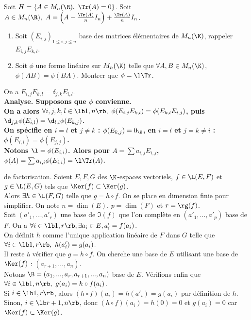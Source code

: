 \documentclass[11pt]{article}
\begin{document}
\begin{ex}{}{}
    Soit $H=\{A\in M_n(\R), ~ \Tr(A)=0\}$. Soit $A\in M_n(\R), ~ A=\left( A-\frac{\Tr(A)}{n}I_n \right)+\frac{\Tr(A)}{n}I_n$.
\end{ex}

\vspace*{-0.8cm}

\begin{ex}{}{}
    \begin{enumerate}
        \item Soit $(E_{i,j})_{1\leq i,j \leq n}$ base des matrices élémentaires de $M_n(\K)$, rappeler $E_{i,j}E_{k,l}$.
        \item Soit $\phi$ une forme linéaire sur $M_n(\K)$ telle que $\forall A,B \in M_n(\K)$, $\phi(AB)=\phi(BA)$. Montrer que $\phi=\l\Tr$.
    \end{enumerate}
    \tcblower
     On a $E_{i,j}E_{k,l}=\delta_{j,k}E_{i,l}$.\\
     \bf{Analyse.} Supposons que $\phi$ convienne.\\
    On a alors $\forall i,j,k,l \in \lb1,n\rb, ~ \phi(E_{i,j}E_{k,l})=\phi(E_{k,l}E_{i,j})$, puis $\d_{j,k}\phi(E_{i,l})=\d_{l,i}\phi(E_{k,j})$.\\
    On spécifie en $i=l$ et $j\neq k$ : $\phi(E_{k,j})=0_\K$, en $i=l$ et $j=k\neq i$ : $\phi(E_{i,i})=\phi(E_{j,j})$.\\
    Notons $\l=\phi(E_{i,i})$. Alors pour $A=\sum a_{i,j}E_{i,j}$, $\phi(A)=\sum a_{i,i}\phi(E_{i,i})=\l\Tr(A)$.
\end{ex}

\vspace*{-0.8cm}

\begin{lemme}{de factorisation.}{}
    Soient $E,F,G$ des $\K$-espaces vectoriels, $f\in\L(E,F)$ et $g\in\L(E,G)$ tels que $\Ker(f)\subset\Ker(g)$.\\
    Alors $\exists h \in \L(F,G)$ telle que $g=h\circ f$.
    \tcblower
    On se place en dimension finie pour simplifier. On note $n=\dim(E)$, $p=\dim(F)$ et $r=\rg(f)$.\\
    Soit $(a'_1,...,a'_r)$ une base de $\Im(f)$ que l'on complète en $(a'_1,...,a'_p)$ base de $F$.     On a $\forall i \in \lb1,r\rb, \exists a_i \in E, a'_i=f(a_i)$.\\
    On définit $h$ comme l'unique application linéaire de $F$ dans $G$ telle que $\forall i \in \lb1,r\rb, ~ h(a'_i)=g(a_i)$.\\
    Il reste à vérifier que $g=h\circ f$. On cherche une base de $E$ utilisant une base de $\Ker(f)$ : $(a_{r+1},...,a_n)$.\\
    Notons $\B=(a_1,...,a_r,a_{r+1},...,a_n)$ base de $E$. Vérifions enfin que $\forall i \in \lb1,n\rb, ~ g(a_i)=h\circ f(a_i)$.\\
    Si $i\in\lb1,r\rb$, alors $(h\circ f)(a_i)=h(a'_i)=g(a_i)$ par définition de $h$.\\
    Sinon, $i\in\lb r+1,n\rb$, donc $(h\circ f)(a_i)=h(0)=0$ et $g(a_i)=0$ car $\Ker(f)\subset\Ker(g)$.
\end{lemme}
\end{document}
